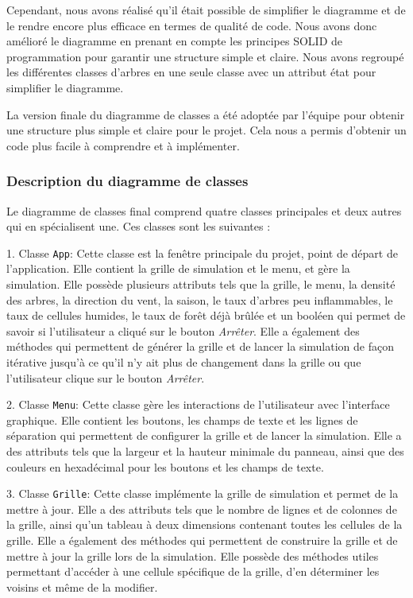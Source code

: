 Cependant, nous avons réalisé qu'il était possible de simplifier le diagramme et de le rendre encore plus efficace en termes de qualité de code. Nous avons donc amélioré le diagramme en prenant en compte les principes SOLID de programmation pour garantir une structure simple et claire. Nous avons regroupé les différentes classes d'arbres en une seule classe avec un attribut état pour simplifier le diagramme.

La version finale du diagramme de classes a été adoptée par l'équipe pour obtenir une structure plus simple et claire pour le projet. Cela nous a permis d'obtenir un code plus facile à comprendre et à implémenter.


\subsubsection{Description du diagramme de classes}

Le diagramme de classes final comprend quatre classes principales et deux autres qui en spécialisent une. Ces classes sont les suivantes :

1. Classe \texttt{App}: Cette classe est la fenêtre principale du projet, point de départ de l’application. Elle contient la grille de simulation et le menu, et gère la simulation. Elle possède plusieurs attributs tels que la grille, le menu, la densité des arbres, la direction du vent, la saison, le taux d'arbres peu inflammables, le taux de cellules humides, le taux de forêt déjà brûlée et un booléen qui permet de savoir si l'utilisateur a cliqué sur le bouton \textit{Arrêter}. Elle a également des méthodes qui permettent de générer la grille et de lancer la simulation de façon itérative jusqu’à ce qu’il n’y ait plus de changement dans la grille ou que l’utilisateur clique sur le bouton \textit{Arrêter}.

2. Classe \texttt{Menu}: Cette classe gère les interactions de l'utilisateur avec l'interface graphique. Elle contient les boutons, les champs de texte et les lignes de séparation qui permettent de configurer la grille et de lancer la simulation. Elle a des attributs tels que la largeur et la hauteur minimale du panneau, ainsi que des couleurs en hexadécimal pour les boutons et les champs de texte.

3. Classe \texttt{Grille}: Cette classe implémente la grille de simulation et permet de la mettre à jour. Elle a des attributs tels que le nombre de lignes et de colonnes de la grille, ainsi qu'un tableau à deux dimensions contenant toutes les cellules de la grille. Elle a également des méthodes qui permettent de construire la grille et de mettre à jour la grille lors de la simulation. Elle possède des méthodes utiles permettant d’accéder à une cellule spécifique de la grille, d’en déterminer les voisins et même de la modifier.

